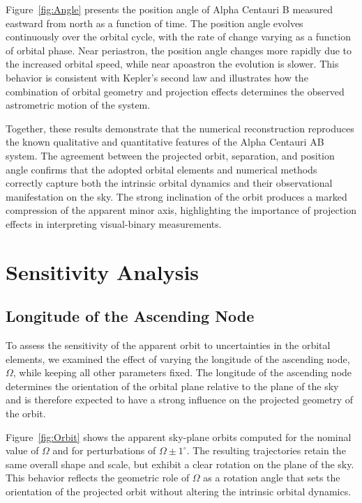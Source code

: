 \documentclass[11pt]{article}
\begin{document}
Figure~\ref{fig:Angle} presents the position angle of Alpha Centauri B measured eastward from north as a function of time. The position angle evolves continuously over the orbital cycle, with the rate of change varying as a function of orbital phase. Near periastron, the position angle changes more rapidly due to the increased orbital speed, while near apoastron the evolution is slower. This behavior is consistent with Kepler’s second law and illustrates how the combination of orbital geometry and projection effects determines the observed astrometric motion of the system.

Together, these results demonstrate that the numerical reconstruction reproduces the known qualitative and quantitative features of the Alpha Centauri AB system. The agreement between the projected orbit, separation, and position angle confirms that the adopted orbital elements and numerical methods correctly capture both the intrinsic orbital dynamics and their observational manifestation on the sky. The strong inclination of the orbit produces a marked compression of the apparent minor axis, highlighting the importance of projection effects in interpreting visual-binary measurements.

\section{Sensitivity Analysis}

\subsection{Longitude of the Ascending Node}

To assess the sensitivity of the apparent orbit to uncertainties in the orbital elements, we examined the effect of varying the longitude of the ascending node, $\Omega$, while keeping all other parameters fixed. The longitude of the ascending node determines the orientation of the orbital plane relative to the plane of the sky and is therefore expected to have a strong influence on the projected geometry of the orbit.

Figure~\ref{fig:Orbit} shows the apparent sky-plane orbits computed for the nominal value of $\Omega$ and for perturbations of $\Omega \pm 1^\circ$. The resulting trajectories retain the same overall shape and scale, but exhibit a clear rotation on the plane of the sky. This behavior reflects the geometric role of $\Omega$ as a rotation angle that sets the orientation of the projected orbit without altering the intrinsic orbital dynamics.
\end{document}
